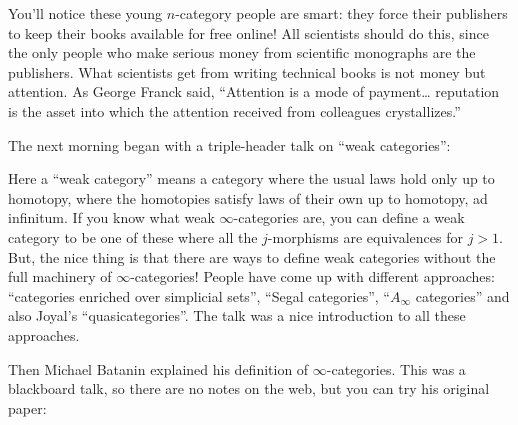 \documentclass{article}
\def\tightlist{}
\renewcommand{\texttt}[1]{%
  \begingroup
  \ttfamily
  \begingroup\lccode`~=`/\lowercase{\endgroup\def~}{/\discretionary{}{}{}}%
  \begingroup\lccode`~=`[\lowercase{\endgroup\def~}{[\discretionary{}{}{}}%
  \begingroup\lccode`~=`.\lowercase{\endgroup\def~}{.\discretionary{}{}{}}%
  \catcode`/=\active\catcode`[=\active\catcode`.=\active
  \scantokens{#1\noexpand}%
  \endgroup
}
\begin{document}

You'll notice these young \(n\)-category people are smart: they force
their publishers to keep their books available for free online! All
scientists should do this, since the only people who make serious money
from scientific monographs are the publishers. What scientists get from
writing technical books is not money but attention. As George Franck
said, ``Attention is a mode of payment\ldots{} reputation is the asset
into which the attention received from colleagues crystallizes.''

The next morning began with a triple-header talk on ``weak categories'':


Here a ``weak category'' means a category where the usual laws hold only
up to homotopy, where the homotopies satisfy laws of their own up to
homotopy, ad infinitum. If you know what weak \(\infty\)-categories are,
you can define a weak category to be one of these where all the
\(j\)-morphisms are equivalences for \(j > 1\). But, the nice thing is
that there are ways to define weak categories without the full machinery
of \(\infty\)-categories! People have come up with different approaches:
``categories enriched over simplicial sets'', ``Segal categories'',
``\(A_\infty\) categories'' and also Joyal's ``quasicategories''. The
talk was a nice introduction to all these approaches.

Then Michael Batanin explained his definition of \(\infty\)-categories.
This was a blackboard talk, so there are no notes on the web, but you
can try his original paper:

\end{document}
